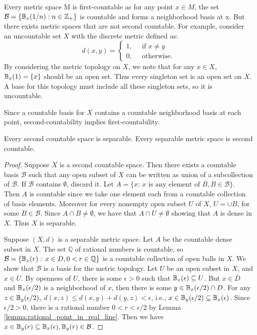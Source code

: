 \documentclass[11pt,a4paper]{article}
\begin{document}
\begin{example}
Every metric space M is first-countable as for any point $x\in M$, the set $\mathcal{B}=\{\mathbb{B}_x(1/n):n\in\mathbb{Z}_+\}$ is countable and forms a neighborhood basis at x. But there exists metric spaces that are not second countable. For example, consider an uncountable set $X$ with the discrete metric defined as:
\[
d(x,y) = 
\begin{cases}
    1, \quad{\text{ if } x \neq y}\\
    0, \quad{\text{ otherwise.}}
\end{cases}
\]
By considering the metric topology on $X$, we note that for any $x\in X$, $\mathbb{B}_x(1) = \{x\}$ should be an open set. Thus every singleton set is an open set on $X$. A base for this topology must include all these singleton sets, so it is uncountable.
\end{example}

\begin{remark}
Since a countable basis for $X$ contains a countable neighborhood basis at each point, second-countability implies first-countability.
\end{remark}

\begin{proposition}\label{prop:metric_space_separable_second_countable}
Every second countable space is separable. Every separable metric space is second countable.
\end{proposition}

\begin{proof}
Suppose $X$ is a second countable space. Then there exists a countable basis $\mathcal{B}$ such that any open subset of $X$ can be written as union of a subcollection of $\mathcal{B}$. If $\mathcal{B}$ contains $\emptyset$, discard it. Let $A = \{x:\,x\text{ is any element of } B,B\in \mathcal{B}\}$. Then $A$ is countable since we take one element each from a countable collection of basis elements. Moreover for every nonempty open subset $U$ of $X$, $U = \cup B$, for some $B\in \mathcal{B}$. Since $A\cap B\neq \emptyset$, we have that $A\cap U\neq \emptyset$ showing that $A$ is dense in $X$. Thus $X$ is separable. 

Suppose $(X,d)$ is a separable metric space. Let $A$ be the countable dense subset in $X$. The set $\mathbb{Q}$ of rational numbers is countable, so $\mathcal{B} = \{\mathbb{B}_{x}(r):\,x\in D, 0<r\in \mathbb{Q}\}$ is a countable collection of open balls in $X$. We show that $\mathcal{B}$ is a basis for the metric topology. Let $U$ be an open subset in $X$, and $x\in U$. By openness of $U$, there is some $\epsilon>0$ such that $\mathbb{B}_x(\epsilon)\subseteq U$. But $x\in \bar{D}$ and $\mathbb{B}_x(\epsilon/2)$ is a neighborhood of $x$, then there is some $y\in \mathbb{B}_x(\epsilon/2)\cap D$. For any $z\in \mathbb{B}_y(\epsilon/2)$, $d(x,z)\le d(x,y)+d(y,z)<\epsilon$, i.e., $x\in \mathbb{B}_y(\epsilon/2)\subseteq \mathbb{B}_x(\epsilon)$. Since $\epsilon/2>0$, there is a rational number $0<r<\epsilon/2$ by Lemma \ref{lemma:rational_point_in_real_line}. Then we have $x\in \mathbb{B}_y(r)\subseteq \mathbb{B}_x(\epsilon),\mathbb{B}_y(r)\in \mathcal{B}$. 
\end{proof}
\end{document}
